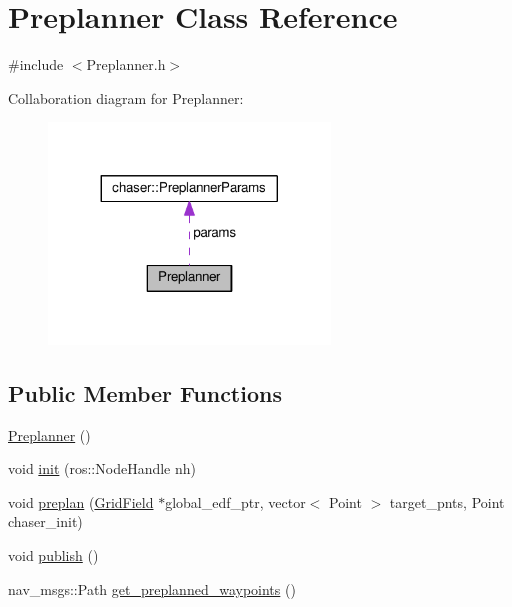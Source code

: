 \hypertarget{class_preplanner}{}\section{Preplanner Class Reference}
\label{class_preplanner}


{\ttfamily \#include $<$Preplanner.\+h$>$}



Collaboration diagram for Preplanner\+:\nopagebreak
\begin{figure}[H]
\begin{center}
\leavevmode
\includegraphics[width=212pt]{class_preplanner__coll__graph}
\end{center}
\end{figure}
\subsection*{Public Member Functions}
\begin{DoxyCompactItemize}
\item 
\hyperlink{class_preplanner_a4314b705278a0e3e070d5389dbb8196e}{Preplanner} ()
\item 
void \hyperlink{class_preplanner_aecde07364cbd05e2e46c95f4f5fd4951}{init} (ros\+::\+Node\+Handle nh)
\item 
void \hyperlink{class_preplanner_a6f0b709012500a44679facf0e18b985a}{preplan} (\hyperlink{struct_grid_field}{Grid\+Field} $\ast$global\+\_\+edf\+\_\+ptr, vector$<$ Point $>$ target\+\_\+pnts, Point chaser\+\_\+init)
\item 
void \hyperlink{class_preplanner_a35f3bfb85ba14d7f0c72bda1522df69e}{publish} ()
\item 
nav\+\_\+msgs\+::\+Path \hyperlink{class_preplanner_a1debbaa8e7ee64b2c22c514f89801cd1}{get\+\_\+preplanned\+\_\+waypoints} ()
\end{DoxyCompactItemize}
